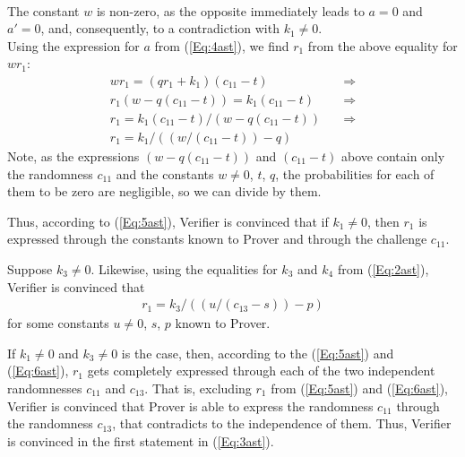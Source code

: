 \documentclass{mathcryptology} %
\theoremstyle{title}
\theoremstyle{titleof}
\renewenvironment{proof}{\noindent{\bfseries Proof:} }{}
\begin{document}
\begin{proof}
\begin{align*}
        \end{align*}   
        The constant $w$ is non-zero, as the opposite immediately leads to $a=0$ and $a'=0$, and, consequently, to a contradiction with $k_{1} \neq0$. \\             
        Using the expression for $a$ from (\ref{Eq:4ast}\label{****}), we find $r_{1}$ from the above equality for $wr_{1}$:
        \begin{align*}
            w r_{1}  = \left(qr_{1}  + k_{1}\right) \left(c_{11}  - t\right)
            &\quad\Rightarrow\\
            r_{1} \left(w-q\left(c_{11} -t\right)\right) = k_{1} \left(c_{11}  - t\right)
            &\quad\Rightarrow\\
            r_{1} = k_{1} \left(c_{11} -t\right) / \left(w-q\left(c_{11} - t\right)\right)
            &\quad\Rightarrow\\
            r_{1} = k_{1} / ((w / (c_{11}-t))-q)
            \label{Eq:5ast}\tag{*****}
        \end{align*}
        Note, as the expressions $(w-q(c_{11}-t))$ and $(c_{11}-t)$ above contain only the randomness $c_{11}$ and the constants $w \neq0$, $t$, $q$, the probabilities for each of them to be zero are negligible, so we can divide by them.  
        
        Thus, according to (\ref{Eq:5ast}\label{*****}), Verifier is convinced that if $k_{1}\neq0$, then $r_{1}$ is expressed through the constants known to Prover and through the challenge $c_{11}$.
        
        Suppose $k_{3}\neq0$. Likewise, using the equalities for $k_{3}$ and $k_{4}$ from (\ref{Eq:2ast}\label{**}), Verifier is convinced that
        \begin{align*}
            r_{1} = k_{3} / ((u / (c_{13}-s))-p) \label{Eq:6ast}\tag{******}
        \end{align*}
        for some constants $u \neq0$, $s$, $p$ known to Prover.

        If $k_{1}\neq0$ and $k_{3}\neq0$ is the case, then, according to the (\ref{Eq:5ast}\label{*****}) and (\ref{Eq:6ast}\label{******}), $r_{1}$ gets completely expressed through each of the two independent randomnesses $c_{11}$ and $c_{13}$. That is, excluding $r_{1}$ from (\ref{Eq:5ast}\label{*****}) and (\ref{Eq:6ast}\label{******}), Verifier is convinced that Prover is able to express the randomness $c_{11}$ through the randomness $c_{13}$, that contradicts to the independence of them. Thus, Verifier is convinced in the first statement in (\ref{Eq:3ast}\label{***}).
        

\end{proof}
\end{document}
